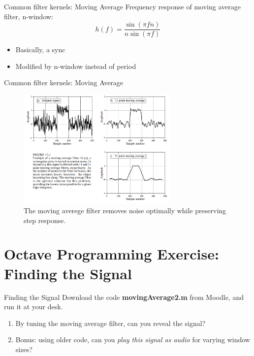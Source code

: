 \documentclass{beamer}
\begin{document}
\begin{frame}{Common filter kernels: Moving Average}
Frequency response of moving average filter, n-window:
\begin{equation}
h(f) = \frac{\sin(\pi f n)}{n\sin(\pi f)}
\end{equation}
\begin{itemize}
\item Basically, a sync
\item Modified by n-window instead of period
\end{itemize}
\end{frame}

\begin{frame}{Common filter kernels: Moving Average}
\small
\begin{figure}
\centering
\includegraphics[width=0.7\textwidth]{figures/moving3.png}
\caption{\label{fig:moving3} The moving averege filter removes noise optimally while preserving step response.}
\end{figure}
\end{frame}

\section{Octave Programming Exercise: Finding the Signal}

\begin{frame}[fragile]{Finding the Signal}
Download the code \textbf{movingAverage2.m} from Moodle, and run it at your desk.
\begin{enumerate}
\item By tuning the moving average filter, can you reveal the signal?
\item Bonus: using older code, can you \textit{play this signal as audio} for varying window sizes?
\end{enumerate}
\end{frame}
\end{document}
